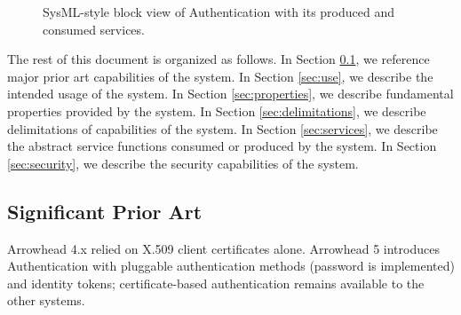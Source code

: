 \documentclass[a4paper]{arrowhead}
\begin{document}
\begin{figure}[ht!]
  \centering
  \caption{SysML-style block view of Authentication with its produced and consumed services.}
  \label{fig:system}
\end{figure}

The rest of this document is organized as follows.
In Section \ref{sec:prior_art}, we reference major prior art capabilities of the system.
In Section \ref{sec:use}, we describe the intended usage of the system.
In Section \ref{sec:properties}, we describe fundamental properties provided by the system.
In Section \ref{sec:delimitations}, we describe delimitations of capabilities of the system.
In Section \ref{sec:services}, we describe the abstract service functions consumed or produced by the system.
In Section \ref{sec:security}, we describe the security capabilities of the system.

\newpage

\subsection{Significant Prior Art}
\label{sec:prior_art}

Arrowhead 4.x relied on X.509 client certificates alone. Arrowhead 5 introduces Authentication with pluggable authentication methods (password is implemented) and identity tokens; certificate-based authentication remains available to the other systems.
\end{document}
